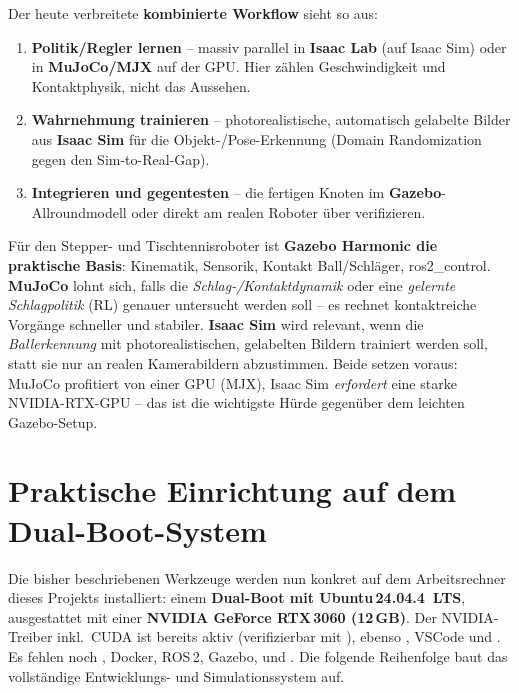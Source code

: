 \noindent Der heute verbreitete \textbf{kombinierte Workflow} sieht so aus:
\begin{enumerate}
\item \textbf{Politik/Regler lernen} -- massiv parallel in \textbf{Isaac Lab}
  (auf Isaac Sim) oder in \textbf{MuJoCo/MJX} auf der GPU. Hier zählen
  Geschwindigkeit und Kontaktphysik, nicht das Aussehen.
\item \textbf{Wahrnehmung trainieren} -- photorealistische, automatisch
  gelabelte Bilder aus \textbf{Isaac Sim} für die Objekt-/Pose-Erkennung
  (Domain Randomization gegen den Sim-to-Real-Gap).
\item \textbf{Integrieren und gegentesten} -- die fertigen Knoten im
  \textbf{Gazebo}-Allroundmodell oder direkt am realen Roboter über
   verifizieren.
\end{enumerate}

\begin{infobox}[title=Einordnung für dieses Projekt]
Für den Stepper- und Tischtennisroboter ist \textbf{Gazebo Harmonic die
praktische Basis}: Kinematik, Sensorik, Kontakt Ball/Schläger, ros2\_control.
\textbf{MuJoCo} lohnt sich, falls die
\emph{Schlag-/Kontaktdynamik} oder eine \emph{gelernte Schlagpolitik}
(RL) genauer untersucht werden soll -- es rechnet kontaktreiche Vorgänge
schneller und stabiler. \textbf{Isaac Sim} wird relevant, wenn die
\emph{Ballerkennung} mit photorealistischen, gelabelten Bildern trainiert
werden soll, statt sie nur an realen Kamerabildern abzustimmen. Beide setzen
voraus: MuJoCo profitiert von einer GPU (MJX), Isaac Sim \emph{erfordert} eine
starke NVIDIA-RTX-GPU -- das ist die wichtigste Hürde gegenüber dem leichten
Gazebo-Setup.
\end{infobox}

\section{Praktische Einrichtung auf dem Dual-Boot-System}
Die bisher beschriebenen Werkzeuge werden nun konkret auf dem Arbeitsrechner
dieses Projekts installiert: einem \textbf{Dual-Boot mit Ubuntu\,24.04.4~LTS},
ausgestattet mit einer \textbf{NVIDIA GeForce RTX\,3060 (12\,GB)}. Der
NVIDIA-Treiber inkl.\ CUDA ist bereits aktiv (verifizierbar mit
), ebenso , VSCode und . Es fehlen noch
, Docker, ROS\,2, Gazebo,  und . Die
folgende Reihenfolge baut das vollständige Entwicklungs- und Simulationssystem
auf.

